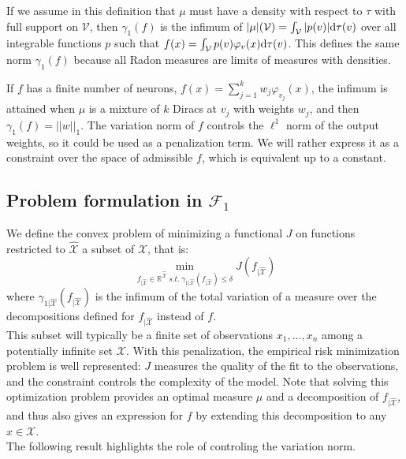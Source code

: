 \documentclass[a4paper, 11pt]{scrartcl}
\begin{document}
{If we assume in this definition that $\mu$ must have a density with respect to $\tau$ with full support on $\mathcal{V}$, then $\gamma_1(f)$ is the infimum of $|\mu|(\mathcal{V}) = \int_\mathcal{V} |p(v)| \textnormal{d}\tau(v)$ over all integrable functions $p$ such that $f(x) = \int_\mathcal{V} p(v) \varphi_v(x)\textnormal{d}\tau(v)$. This defines the same norm $\gamma_1(f)$ because all Radon measures are limits of measures with densities.

If $f$ has a finite number of neurons, $f(x) = \sum_{j=1}^k w_j \varphi_{v_j}(x)$, the infimum is attained when $\mu$ is a mixture of $k$ Diracs at $v_j$ with weights $w_j$, and then $\gamma_1(f) = ||w||_1$. The variation norm of $f$ controls the $\ell^1$ norm of the output weights, so it could be used as a penalization term. We will rather express it as a constraint over the space of admissible $f$, which is equivalent up to a constant.

\subsection{Problem formulation in $\mathcal{F}_1$}

We define the convex problem of minimizing a functional $J$ on functions restricted to $\mathcal{\hat X}$ a subset of $\mathcal{X}$, that is:
\begin{equation}
\min_{f_{|\mathcal{\hat X}} \in \mathbb{R}^\mathcal{\hat X}~ s.t. ~ \gamma_{1|\mathcal{\hat X}} (f_{|\mathcal{\hat X}}) \leq \delta} J(f_{|\mathcal{\hat X}})
\end{equation}
where $\gamma_{1|\mathcal{\hat X}} (f_{|\mathcal{\hat X}})$ is the infimum of the total variation of a measure over the decompositions defined for $f_{|\mathcal{\hat X}}$ instead of $f$.\\

This subset will typically be a finite set of observations $x_1,...,x_n$ among a potentially infinite set $\mathcal{X}$. With this penalization, the empirical risk minimization problem is well represented: $J$ measures the quality of the fit to the observations, and the constraint controls the complexity of the model. Note that solving this optimization problem provides an optimal measure $\mu$ and a decomposition of $f_{|\mathcal{\hat X}}$, and thus also gives an expression for $f$ by extending this decomposition to any $x\in \mathcal{X}$. \\

The following result highlights the role of controling the variation norm.

}
\end{document}
